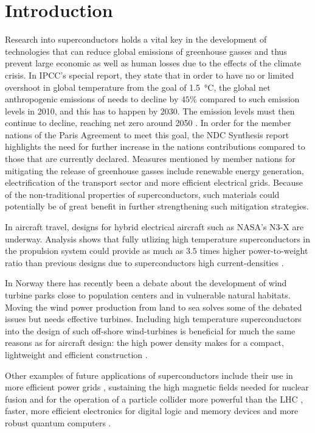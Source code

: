 \chapter{Introduction}\noindent


Research into superconductors holds a vital key in the development of technologies that can reduce global emissions of greenhouse gasses
and thus prevent large economic as well as human losses due to the effects of the climate crisis.
In IPCC's special report, they state that in order to have no or limited overshoot in global temperature from the goal of \SI{1.5}{\degreeCelsius},
the global net anthropogenic emissions of  needs to decline by $45\%$ compared to such emission levels in 2010, and this has to happen
by 2030. The emission levels must then continue to decline, reaching net zero around 2050 \cite{Allen18}.
In order for the member nations of the Paris Agreement to meet this goal, the NDC Synthesis report \cite{NDC21} highlights the need for further
increase in the nations contributions compared to those that are currently declared. Measures mentioned by member nations for mitigating the
release of greenhouse gasses include renewable energy generation, electrification of the transport sector and more efficient electrical grids.
Because of the non-traditional properties of superconductors, such materials could potentially be of great benefit in further strengthening
such mitigation strategies.

In aircraft travel, designs for hybrid electrical aircraft such as NASA's N3-X are underway. Analysis shows that fully utlizing high temperature
superconductors in the propulsion system could provide as much as $3.5$ times higher power-to-weight ratio than previous designs due to
superconductors high current-densities \cite{Corduan20}.

In Norway there has recently been a debate about the development of wind turbine parks close to population centers and in vulnerable natural
habitats. Moving the wind power production from land to sea solves some of the debated issues but needs effective turbines. Including high
temperature superconductors into the design of such off-shore wind-turbines is beneficial for much the same reasons as for aircraft design:
the high power density makes for a compact, lightweight and efficient construction \cite{Cheng21, Liu18}.

Other examples of future applications of superconductors include their use in more efficient power grids \cite{Tixador19, Stemmle14}, sustaining the high
magnetic fields needed for nuclear fusion \cite{Hartwig20, Whyte19} and for the operation of a particle collider more powerful than the
LHC \cite{Mentink18}, faster, more efficient electronics for digital logic and memory devices and more robust quantum computers \cite{Bommer19}.

